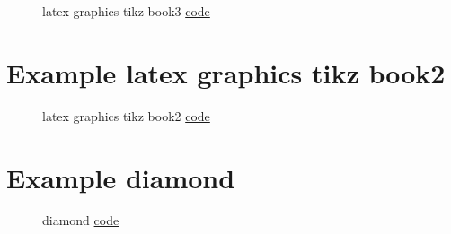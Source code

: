 \documentclass{article}
\begin{document}
\begin{figure}[H]
	\centering
	
	\caption{latex graphics tikz book3 \href{https:/github.com/cauliyang/learn_tikz/blob/main/latex_graphics_tikz_book3.tex}{code} }
	\label{fig:latex graphics tikz book3}
\end{figure}

\section{Example latex graphics tikz book2}

\begin{figure}[H]
	\centering
	
	\caption{latex graphics tikz book2 \href{https:/github.com/cauliyang/learn_tikz/blob/main/latex_graphics_tikz_book2.tex}{code} }
	\label{fig:latex graphics tikz book2}
\end{figure}

\section{Example diamond}

\begin{figure}[H]
	\centering
	
	\caption{diamond \href{https:/github.com/cauliyang/learn_tikz/blob/main/diamond.tex}{code} }
	\label{fig:diamond}
\end{figure}
\end{document}
